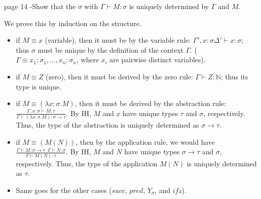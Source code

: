 \begin{problem}{page 14}
 -Show that the $\sigma$ with $\Gamma \vdash M:\sigma$ is uniquely determined by $\Gamma$ and $M$.
\end{problem}

\begin{solution}
    We prove this by induction on the structure.
    \begin{itemize}
        \item if $M \equiv x$ (variable), then it must be by the variable rule: $\Gamma', x:\sigma \Delta' \vdash x:\sigma$; thus $\sigma$ must be unique by the definition of the context $\Gamma$.
                ($\Gamma \equiv x_1:\sigma_1, ..., x_n:\sigma_n$, where $x_i$ are pairwise distinct variables).
        
        \item if $M \equiv Z$ (zero), then it must be derived by the zero rule: $\Gamma \vdash Z:\mathbb{N}$; thus its type is unique.
        
        \item if $M \equiv (\lambda x:\sigma.M)$, then it must be derived by the abstraction rule: $\frac{\Gamma, x:\sigma \vdash M:\tau}{\Gamma \vdash (\lambda x:\sigma.M):\sigma \to \tau}$.
                By IH, $M$ and $x$ have unique types $\tau$ and $\sigma$, respectively. Thus, the type of the abstraction is uniquely determined as $\sigma \to \tau$.
                
        \item if $M \equiv (M(N))$, then by the application rule, we would have $\frac{\Gamma \vdash M:\sigma \to \tau \;\; \Gamma \vdash N:\sigma}{\Gamma \vdash M(N) : \tau}$.
                By IH, $M$ and $N$ have unique types $\sigma \to \tau$ and $\sigma$, respectively. Thus, the type of the application $M(N)$ is uniquely determined as $\tau$.

        \item Same goes for the other cases ($succ$, $pred$, $Y_\sigma$, and $ifz$).
    \end{itemize}
\end{solution}